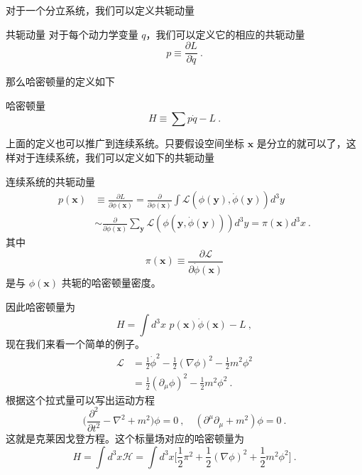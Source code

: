 对于一个分立系统，我们可以定义共轭动量
\begin{definition}{共轭动量}
对于每个动力学变量 $q$，我们可以定义它的相应的共轭动量
\begin{equation}
p \equiv \frac{\partial L}{\partial \dot q}~.
\end{equation}
\end{definition}
那么哈密顿量的定义如下
\begin{definition}{哈密顿量}
\begin{equation}\label{eq_classi_1}
H \equiv \sum p \dot q - L~.
\end{equation}
\end{definition}
上面的定义也可以推广到连续系统。只要假设空间坐标 $\mathbf x$ 是分立的就可以了，这样对于连续系统，我们可以定义如下的共轭动量
\begin{definition}{连续系统的共轭动量}
\begin{equation}
\begin{aligned}
p(\mathbf x) & \equiv \frac{\partial L}{\partial \dot \phi(\mathbf x)} = \frac{\partial}{\partial \dot \phi(\mathbf x)} \int \mathcal L(\phi(\mathbf y),\dot \phi(\mathbf y)) d^3 y \\
& \sim \frac{\partial}{\partial \dot \phi(\mathbf x)} \sum_{\mathbf y} \mathcal L(\phi(\mathbf y,\dot \phi(\mathbf y))) d^3 y=\pi(\mathbf x) d^3 x~.
\end{aligned}
\end{equation}
其中
\begin{equation}
\pi(\mathbf x) \equiv \frac{\partial \mathcal L}{\partial \dot \phi(\mathbf x)}
\end{equation}
是与 $\phi(\mathbf x)$ 共轭的哈密顿量密度。
\end{definition}
因此哈密顿量为
\begin{equation}
H = \int d^3 x\,\, p(\mathbf x) \dot \phi(\mathbf x) - L~,
\end{equation}
现在我们来看一个简单的例子。
\begin{align}\nonumber
\mathcal L & = \frac{1}{2} \dot \phi^2 - \frac{1}{2} (\nabla \phi)^2 - \frac{1}{2} m^2 \phi^2 \\
& = \frac{1}{2} (\partial_\mu\phi)^2 - \frac{1}{2} m^2 \phi^2~.
\end{align}
根据这个拉式量可以写出运动方程
\begin{equation}
\bigg( \frac{\partial^2}{\partial t^2} - \nabla^2 +m^2 \bigg)\phi = 0~,\quad (\partial^\mu\partial_\mu+m^2)\phi = 0~.
\end{equation}
这就是克莱因戈登方程。这个标量场对应的哈密顿量为
\begin{equation}
H =  \int d^3x \mathcal H = \int d^3 x \bigg[ \frac{1}{2} \pi^2 + \frac{1}{2} (\nabla \phi)^2 + \frac{1}{2} m^2 \phi^2 \bigg] ~.
\end{equation} 


